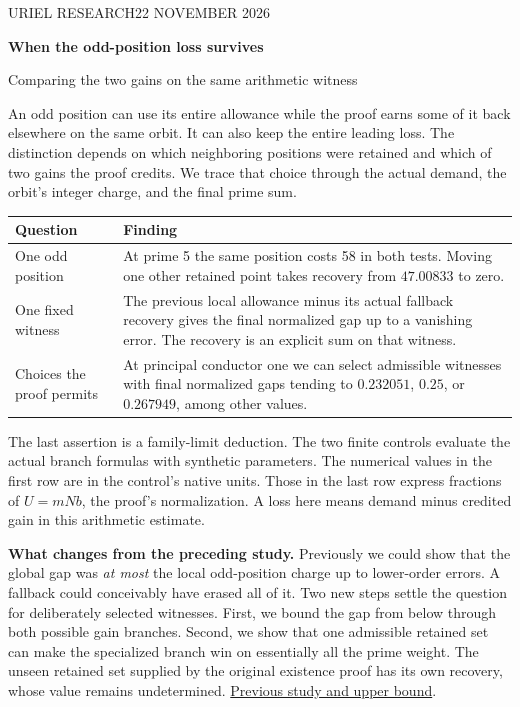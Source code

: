 \documentclass[12pt,letterpaper]{article}
\newcommand{\para}[1]{\par\medskip\noindent\textbf{#1}\quad}
\begin{document}
\thispagestyle{plain}
{\sffamily\small\color{accent}URIEL RESEARCH\hfill 22 NOVEMBER 2026}\par\vspace{12pt}
{\Huge\bfseries\color{ink}When the odd-position loss survives\par}\vspace{5pt}
{\Large\color{muted}Comparing the two gains on the same arithmetic witness}\par\bigskip

An odd position can use its entire allowance while the proof earns some of it back elsewhere on the same orbit. It can also keep the entire leading loss. The distinction depends on which neighboring positions were retained and which of two gains the proof credits. We trace that choice through the actual demand, the orbit's integer charge, and the final prime sum.

\begin{center}\begin{tabularx}{\linewidth}{@{}p{.29\linewidth}Y@{}}\toprule
Question & Finding\\\midrule
One odd position & At prime 5 the same position costs 58 in both tests. Moving one other retained point takes recovery from \(47.00833\) to zero.\\
One fixed witness & The previous local allowance minus its actual fallback recovery gives the final normalized gap up to a vanishing error. The recovery is an explicit sum on that witness.\\
Choices the proof permits & At principal conductor one we can select admissible witnesses with final normalized gaps tending to \(0.232051\), \(0.25\), or \(0.267949\), among other values.\\\bottomrule
\end{tabularx}\end{center}
The last assertion is a family-limit deduction. The two finite controls evaluate the actual branch formulas with synthetic parameters. The numerical values in the first row are in the control's native units. Those in the last row express fractions of \(U=mNb\), the proof's normalization. A loss here means demand minus credited gain in this arithmetic estimate.

\para{What changes from the preceding study.} Previously we could show that the global gap was \emph{at most} the local odd-position charge up to lower-order errors. A fallback could conceivably have erased all of it. Two new steps settle the question for deliberately selected witnesses. First, we bound the gap from below through both possible gain branches. Second, we show that one admissible retained set can make the specialized branch win on essentially all the prime weight. The unseen retained set supplied by the original existence proof has its own recovery, whose value remains undetermined.
\href{https://github.com/nousentllc/riemann-hypothesis/pull/10}{Previous study and upper bound}.
\end{document}

